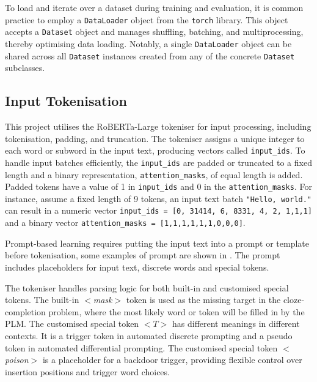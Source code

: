 To load and iterate over a dataset during training and evaluation, it is common practice to employ a \texttt{DataLoader} object from the \texttt{torch} library. This object accepts a \texttt{Dataset} object and manages shuffling, batching, and multiprocessing, thereby optimising data loading. Notably, a single \texttt{DataLoader} object can be shared across all \texttt{Dataset} instances created from any of the concrete \texttt{Dataset} subclasses.

\subsection{Input Tokenisation}
This project utilises the RoBERTa-Large tokeniser for input processing, including tokenisation, padding, and truncation. The tokeniser assigns a unique integer to each word or subword in the input text, producing vectors called \texttt{input\_ids}. To handle input batches efficiently, the \texttt{input\_ids} are padded or truncated to a fixed length and a binary representation, \texttt{attention\_masks}, of equal length is added. Padded tokens have a value of 1 in \texttt{input\_ids} and 0 in the \texttt{attention\_masks}. For instance, assume a fixed length of 9 tokens, an input text batch \texttt{"Hello, world."} can result in a numeric vector \texttt{input\_ids = [0, 31414, 6, 8331, 4, 2, 1,1,1]} and a binary vector \texttt{attention\_masks = [1,1,1,1,1,1,0,0,0]}.

Prompt-based learning requires putting the input text into a prompt or template before tokenisation, some examples of prompt are shown in . The prompt includes placeholders for input text, discrete words and special tokens.



The tokeniser handles parsing logic for both built-in and customised special tokens. The built-in $<$\textit{mask}$>$ token is used as the missing target in the cloze-completion problem, where the most likely word or token will be filled in by the PLM. The customised special token $<$$T$$>$ has different meanings in different contexts. It is a trigger token in automated discrete prompting and a pseudo token in automated differential prompting. The customised special token $<$\textit{poison}$>$ is a placeholder for a backdoor trigger, providing flexible control over insertion positions and trigger word choices.
\vspace{-1em}
